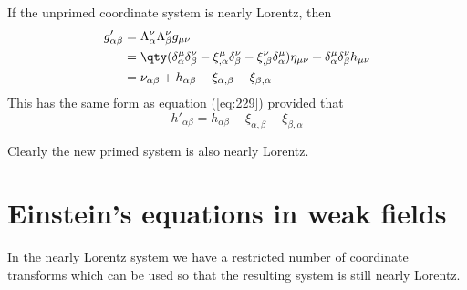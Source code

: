 If the unprimed coordinate system is nearly Lorentz, then
\begin{align*}
  g'_{\alpha \beta} &= \Lambda_{\alpha}^{\nu} \Lambda_{\beta}^{\nu} g_{\mu \nu} \\
&= \qty( \delta_{\alpha}^{\mu} \delta_{\beta}^{\nu} - \xi_{,\alpha}^{\mu} \delta_{\beta}^{\nu} - \xi^{\nu}_{,\beta} \delta_{\alpha}^{\mu} ) \eta_{\mu \nu} + \delta_{\alpha}^{\mu} \delta_{\beta}^{\nu} h_{\mu \nu} \\
&= \nu_{\alpha \beta} + h_{\alpha \beta} -\xi_{\alpha, \beta} - \xi_{\beta , \alpha}
\end{align*}
This has the same form as equation (\ref{eq:229}) provided that
\[ h'_{\alpha \beta} = h_{\alpha \beta} - \xi_{\alpha, \beta} - \xi_{\beta, \alpha} \]

Clearly the new primed system is also nearly Lorentz.

\section{Einstein's equations in weak fields}
\label{sec:einst-equat-weak}

In the nearly Lorentz system we have a restricted number of coordinate
transforms which can be used so that the resulting system is still
nearly Lorentz.

